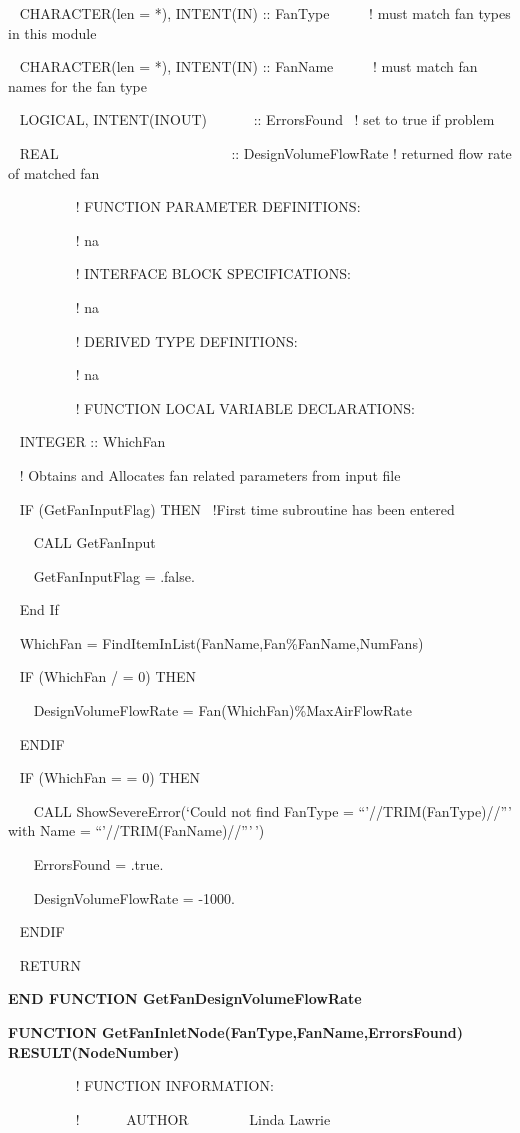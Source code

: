 ~ CHARACTER(len = *), INTENT(IN) :: FanType~~~~~ ! must match fan types in this module

~ CHARACTER(len = *), INTENT(IN) :: FanName~~~~~ ! must match fan names for the fan type

~ LOGICAL, INTENT(INOUT)~~~~~~ :: ErrorsFound~ ! set to true if problem

~ REAL~~~~~~~~~~~~~~~~~~~~~~~~ :: DesignVolumeFlowRate ! returned flow rate of matched fan

~~~~~~~~~ ! FUNCTION PARAMETER DEFINITIONS:

~~~~~~~~~ ! na

~~~~~~~~~ ! INTERFACE BLOCK SPECIFICATIONS:

~~~~~~~~~ ! na

~~~~~~~~~ ! DERIVED TYPE DEFINITIONS:

~~~~~ ~~~~! na

~~~~~~~~~ ! FUNCTION LOCAL VARIABLE DECLARATIONS:

~ INTEGER :: WhichFan

~ ! Obtains and Allocates fan related parameters from input file

~ IF (GetFanInputFlag) THEN~ !First time subroutine has been entered

~~~ CALL GetFanInput

~~~ GetFanInputFlag = .false.

~ End If

~ WhichFan = FindItemInList(FanName,Fan\%FanName,NumFans)

~ IF (WhichFan / = 0) THEN

~~~ DesignVolumeFlowRate = Fan(WhichFan)\%MaxAirFlowRate

~ ENDIF

~ IF (WhichFan = = 0) THEN

~~~ CALL ShowSevereError(`Could not find FanType = ``'//TRIM(FanType)//''' with Name = ``'//TRIM(FanName)//'''\,')

~~~ ErrorsFound = .true.

~~~ DesignVolumeFlowRate = -1000.

~ ENDIF

~ RETURN

\textbf{END FUNCTION GetFanDesignVolumeFlowRate}

\textbf{FUNCTION GetFanInletNode(FanType,FanName,ErrorsFound) RESULT(NodeNumber)}

~~~~~~~~~ ! FUNCTION INFORMATION:

~~~~~~~~~ !~~~~~~ AUTHOR~~~~~~~~ Linda Lawrie

